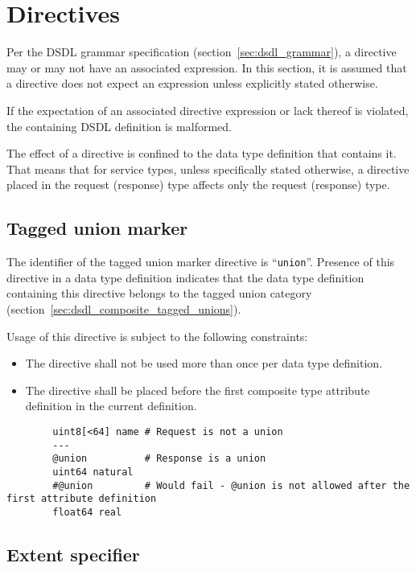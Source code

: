 \section{Directives}\label{sec:dsdl_directives}

Per the DSDL grammar specification (section~\ref{sec:dsdl_grammar}),
a directive may or may not have an associated expression.
In this section, it is assumed that a directive does not expect an expression unless explicitly stated otherwise.

If the expectation of an associated directive expression or lack thereof is violated,
the containing DSDL definition is malformed.

The effect of a directive is confined to the data type definition that contains it.
That means that for service types, unless specifically stated otherwise,
a directive placed in the request (response) type affects only the request (response) type.

\subsection{Tagged union marker}

The identifier of the tagged union marker directive is ``\verb|union|''.
Presence of this directive in a data type definition indicates that the
data type definition containing this directive belongs to the tagged union category
(section~\ref{sec:dsdl_composite_tagged_unions}).

Usage of this directive is subject to the following constraints:
\begin{itemize}
    \item The directive shall not be used more than once per data type definition.
    \item The directive shall be placed before the first composite type attribute definition in the current definition.
\end{itemize}

\begin{remark}
    \begin{verbatim}
        uint8[<64] name # Request is not a union
        ---
        @union          # Response is a union
        uint64 natural
        #@union         # Would fail - @union is not allowed after the first attribute definition
        float64 real
    \end{verbatim}
\end{remark}

\subsection{Extent specifier}\label{sec:dsdl_directive_extent}

